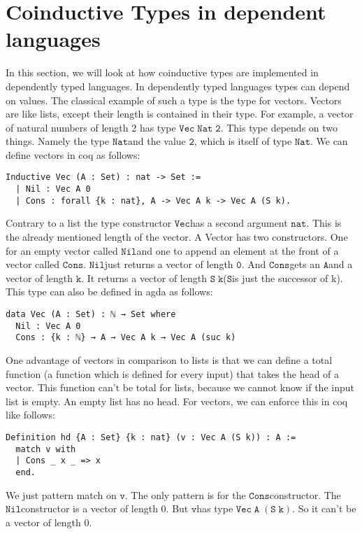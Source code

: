 \documentclass[a4paper,cleardoubleempty,BCOR1cm]{scrbook}
\begin{document}
\chapter{Coinductive Types in dependent languages}
\label{sec:org7c6cefc}
In this section, we will look at how coinductive types are implemented in
dependently typed languages. In dependently typed languages types can depend on
values. The classical example of such a type is the type for vectors. Vectors are like
lists, except their length is contained in their type. For example, a vector of
natural numbers of length 2 has type $\mathtt{Vec\;Nat\;2}$. This type depends on two
things. Namely the type $\mathtt{Nat}$\;and the value $\mathtt{2}$, which is itself of type $\mathtt{Nat}$.
We can define vectors in coq as follows:
\begin{verbatim}
Inductive Vec (A : Set) : nat -> Set :=
  | Nil : Vec A 0
  | Cons : forall {k : nat}, A -> Vec A k -> Vec A (S k).
\end{verbatim}
Contrary to a list the type constructor $\mathtt{Vec}$\;has a second argument $\mathtt{nat}$.
This is the already mentioned length of the vector. A Vector has two
constructors. One for an empty vector called $\mathtt{Nil}$\;and one to append an
element at the front of a vector called $\mathtt{Cons}$. $\mathtt{Nil}$\;just returns a vector
of length $\mathtt{0}$. And $\mathtt{Cons}$\;gets an $\mathtt{A}$\;and a vector of length $\mathtt{k}$. It returns a
vector of length $\mathtt{S\;k}$\;($\mathtt{S}$\;is just the successor of k). This type can also be
defined in agda as follows:
\begin{verbatim}
data Vec (A : Set) : ℕ → Set where
  Nil : Vec A 0
  Cons : {k : ℕ} → A → Vec A k → Vec A (suc k)
\end{verbatim}
One advantage of vectors in comparison to lists is that we can define a total function
(a function which is defined for every input) that takes the head of a
vector. This function can't be total for lists, because we cannot know if the
input list is empty. An empty list has no head. For vectors, we can enforce this
in coq like follows:
\begin{verbatim}
Definition hd {A : Set} {k : nat} (v : Vec A (S k)) : A :=
  match v with
  | Cons _ x _ => x
  end.
\end{verbatim}
We just pattern match on $\mathtt{v}$.  The only pattern is for the $\mathtt{Cons}$\;constructor.  The $\mathtt{Nil}$\;constructor
is a vector of length 0.  But $\mathtt{v}$\;has type $\mathtt{Vec\;A\;(S\;k)}$.  So it can't be a vector of length 0.
\end{document}
